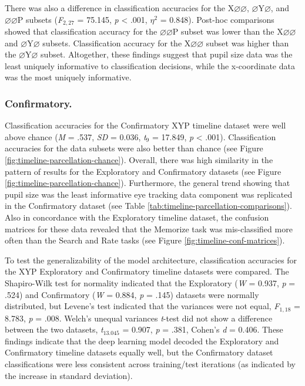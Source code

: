 \documentclass[
  english,
  man, donotrepeattitle,floatsintext]{apa6}
\begin{document}
There was also a difference in classification accuracies for the X\(\varnothing\varnothing\), \(\varnothing\)Y\(\varnothing\), and \(\varnothing\varnothing\)P subsets (\emph{F}\(_{2, 27}\) = 75.145, \emph{p} \textless{} .001, \textit{$\eta$}\(^{2}\) = 0.848). Post-hoc comparisons showed that classification accuracy for the \(\varnothing\varnothing\)P subset was lower than the X\(\varnothing\varnothing\) and \(\varnothing\)Y\(\varnothing\) subsets. Classification accuracy for the X\(\varnothing\varnothing\) subset was higher than the \(\varnothing\)Y\(\varnothing\) subset. Altogether, these findings suggest that pupil size data was the least uniquely informative to classification decisions, while the x-coordinate data was the most uniquely informative.

\subsubsection{Confirmatory.}

Classification accuracies for the Confirmatory XYP timeline dataset were well above chance (\emph{M} = .537, \emph{SD} = 0.036, \emph{t}\(_{9}\) = 17.849, \emph{p} \textless{} .001). Classification accuracies for the data subsets were also better than chance (see Figure \ref{fig:timeline-parcellation-chance}). Overall, there was high similarity in the pattern of results for the Exploratory and Confirmatory datasets (see Figure \ref{fig:timeline-parcellation-chance}). Furthermore, the general trend showing that pupil size was the least informative eye tracking data component was replicated in the Confirmatory dataset (see Table \ref{tab:timeline-parcellation-comparisons}). Also in concordance with the Exploratory timeline dataset, the confusion matrices for these data revealed that the Memorize task was mis-classified more often than the Search and Rate tasks (see Figure \ref{fig:timeline-conf-matrices}).

To test the generalizability of the model architecture, classification accuracies for the XYP Exploratory and Confirmatory timeline datasets were compared. The Shapiro-Wilk test for normality indicated that the Exploratory (\emph{W} = 0.937, \emph{p} = .524) and Confirmatory (\emph{W} = 0.884, \emph{p} = .145) datasets were normally distributed, but Levene's test indicated that the variances were not equal, \emph{F}\(_{1, 18}\) = 8.783, \emph{p} = .008. Welch's unequal variances \emph{t}-test did not show a difference between the two datasets, \emph{t}\(_{13.045}\) = 0.907, \emph{p} = .381, Cohen's \emph{d} = 0.406. These findings indicate that the deep learning model decoded the Exploratory and Confirmatory timeline datasets equally well, but the Confirmatory dataset classifications were less consistent across training/test iterations (as indicated by the increase in standard deviation).
\end{document}
